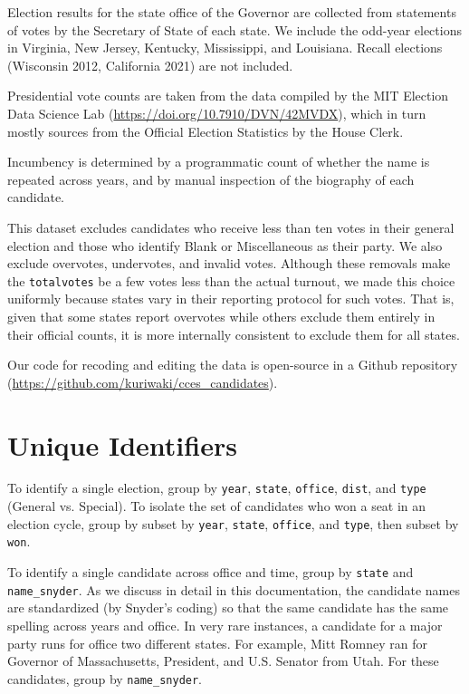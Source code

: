 \documentclass[12pt]{article}
\begin{document}
Election results for the state office of the Governor are collected from statements of votes by the Secretary of State of each state. We include the odd-year elections in Virginia, New Jersey, Kentucky, Mississippi, and Louisiana. 
Recall elections (Wisconsin 2012, California 2021) are not included.

Presidential vote counts are taken from the data compiled by the MIT Election Data Science Lab (\url{https://doi.org/10.7910/DVN/42MVDX}), which in turn mostly sources from the Official Election Statistics by the House Clerk. 

Incumbency is determined by a programmatic count of whether the name is repeated across years, and by manual inspection of the biography of each candidate.

This dataset excludes candidates who receive less than ten votes in their general election and those who identify Blank or Miscellaneous as their party.
We also exclude overvotes, undervotes, and invalid votes.
Although these removals make the \texttt{totalvotes} be a few votes less than the actual turnout, we made this choice uniformly because states vary in their reporting protocol for such votes. That is, given that some states report overvotes while others exclude them entirely in their official counts, it is more internally consistent to exclude them for all states.

Our code for recoding and editing the data is open-source in a Github repository (\url{https://github.com/kuriwaki/cces_candidates}).


\section{Unique Identifiers}

To identify a single election, group by \texttt{year}, \texttt{state}, \texttt{office}, \texttt{dist}, and \texttt{type} (General vs. Special).  To isolate the set of candidates who won a seat in an election cycle, group by subset by \texttt{year}, \texttt{state}, \texttt{office}, and \texttt{type}, then subset by \texttt{won}.

To identify a single candidate across office and time, group by \texttt{state} and  \texttt{name\_snyder}. 
As we discuss in detail in this documentation, the candidate names are standardized (by Snyder's coding) so that the same candidate has the same spelling across years and office.
In very rare instances, a candidate for a major party runs for office two different states. For example, Mitt Romney ran for Governor of Massachusetts, President, and U.S. Senator from Utah. For these candidates, group by \texttt{name\_snyder}. 
\end{document}
